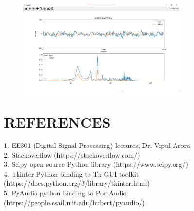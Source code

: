 \documentclass{article}
\begin{document}
\begin{figure}[htb]
\centering
  \centerline{\includegraphics[width=8.5cm]{4}}
\caption{}
\label{fig:fig3}
\end{figure}


\section{REFERENCES}
\label{sec:refs}

1. EE301 (Digital Signal Processing) lectures, Dr. Vipul Arora\\
2. Stackoverflow (https://stackoverflow.com/)\\
3. Scipy open source Python library (https://www.scipy.org/)\\
4. Tkinter Python binding to Tk GUI toolkit\\ (https://docs.python.org/3/library/tkinter.html)\\
5. PyAudio python binding to PortAudio\\
(https://people.csail.mit.edu/hubert/pyaudio/)
\end{document}
